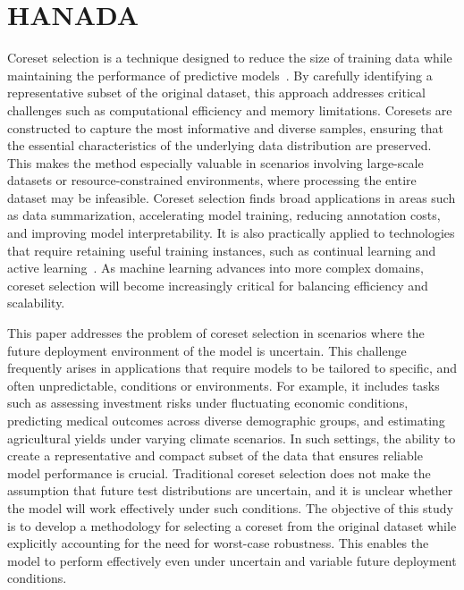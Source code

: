 
\section{HANADA}

Coreset selection is a technique designed to reduce the size of training data while maintaining the performance of predictive models~\citep{guo2022deepcore}.
%
By carefully identifying a representative subset of the original dataset, this approach addresses critical challenges such as computational efficiency and memory limitations.
%
Coresets are constructed to capture the most informative and diverse samples, ensuring that the essential characteristics of the underlying data distribution are preserved.
%
This makes the method especially valuable in scenarios involving large-scale datasets or resource-constrained environments, where processing the entire dataset may be infeasible.
%
Coreset selection finds broad applications in areas such as data summarization, accelerating model training, reducing annotation costs, and improving model interpretability.
%
It is also practically applied to technologies that require retaining useful training instances, such as continual learning and active learning~\citep{sener2017active, toneva2019forgetting, paul2021deep, ducoffe2018adversarial, margatina2021active}.
%
As machine learning advances into more complex domains, coreset selection will become increasingly critical for balancing efficiency and scalability.

This paper addresses the problem of coreset selection in scenarios where the future deployment environment of the model is uncertain.
%
This challenge frequently arises in applications that require models to be tailored to specific, and often unpredictable, conditions or environments.
%
For example, it includes tasks such as assessing investment risks under fluctuating economic conditions, predicting medical outcomes across diverse demographic groups, and estimating agricultural yields under varying climate scenarios.
%
In such settings, the ability to create a representative and compact subset of the data that ensures reliable model performance is crucial.
%
Traditional coreset selection does not make the assumption that future test distributions are uncertain, and it is unclear whether the model will work effectively under such conditions.
%
The objective of this study is to develop a methodology for selecting a coreset from the original dataset while explicitly accounting for the need for worst-case robustness. This enables the model to perform effectively even under uncertain and variable future deployment conditions.

